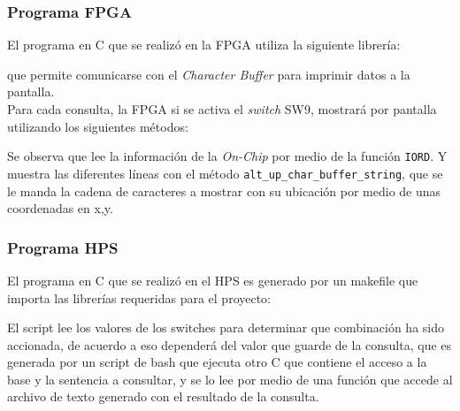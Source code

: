 \documentclass[conference]{IEEEtran}
\begin{document}
\subsubsection*{Programa FPGA}
El programa en C que se realizó en la FPGA utiliza la siguiente librería:

que permite comunicarse con el \textit{Character Buffer} para imprimir datos a la pantalla. \\
Para cada consulta, la FPGA si se activa el \textit{switch} SW9, mostrará por pantalla utilizando los siguientes métodos:

Se observa que lee la información de la \textit{On-Chip} por medio de la función {\footnotesize\texttt{IORD}}. Y muestra las diferentes líneas con el método {\footnotesize\texttt{alt\_up\_char\_buffer\_string}}, que se le manda la cadena de caracteres a mostrar con su ubicación por medio de unas coordenadas en x,y.

\subsubsection*{Programa HPS}
El programa en C que se realizó en el HPS es generado por un makefile que importa las librerías requeridas para el proyecto:

El script lee los valores de los switches para determinar que combinación ha sido accionada, de acuerdo a eso dependerá del valor que guarde de la consulta, que es generada por un script de bash que ejecuta otro C que contiene el acceso a la base y la sentencia a consultar, y se lo lee por medio de una función que accede al archivo de texto generado con el resultado de la consulta.

\end{document}
